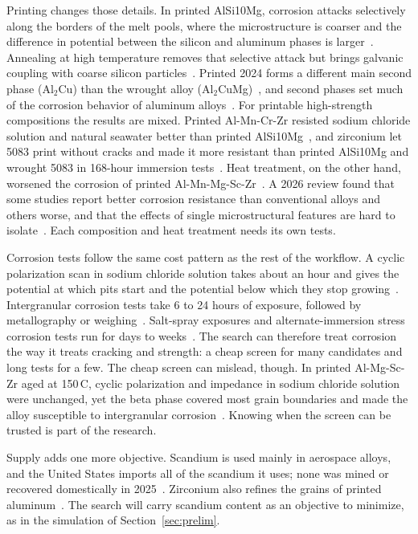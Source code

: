 \documentclass[12pt,letterpaper]{article}
\begin{document}
Printing changes those details. In printed AlSi10Mg, corrosion attacks
selectively along the borders of the melt pools, where the microstructure is
coarser and the difference in potential between the silicon and aluminum
phases is larger~\cite{cabrini2016,revilla2017}. Annealing at high temperature
removes that selective attack but brings galvanic coupling with coarse
silicon particles~\cite{cabrini2016}. Printed 2024 forms a different main
second phase (Al$_2$Cu) than the wrought alloy (Al$_2$CuMg)~\cite{gharbi2018},
and second phases set much of the corrosion behavior of aluminum
alloys~\cite{birbilis2005}. For printable high-strength compositions
the results are mixed. Printed Al-Mn-Cr-Zr resisted sodium chloride solution
and natural seawater better than printed AlSi10Mg~\cite{linder2024}, and
zirconium let 5083 print without cracks and made it more resistant than
printed AlSi10Mg and wrought 5083 in 168-hour immersion
tests~\cite{zhou2021}. Heat treatment, on the other hand, worsened the
corrosion of printed Al-Mn-Mg-Sc-Zr~\cite{zhang2023}. A 2026 review found
that some studies report better corrosion resistance than conventional
alloys and others worse, and that the effects of single microstructural
features are hard to isolate~\cite{alhashem2026}. Each composition and heat
treatment needs its own tests.

Corrosion tests follow the same cost pattern as the rest of the workflow. A
cyclic polarization scan in sodium chloride solution takes about an hour and
gives the potential at which pits start and the potential below which they
stop growing~\cite{astmG61}. Intergranular corrosion tests take 6 to 24
hours of exposure, followed by metallography or
weighing~\cite{astmG110,astmG67,cabreracorrea2022}. Salt-spray exposures and alternate-immersion
stress corrosion tests run for days to weeks~\cite{astmB117,astmG44}. The
search can therefore treat corrosion the way it treats cracking and strength:
a cheap screen for many candidates and long tests for a few. The cheap screen
can mislead, though. In printed Al-Mg-Sc-Zr aged at 150\,\textdegree{}C,
cyclic polarization and impedance in sodium chloride solution were unchanged,
yet the beta phase covered most grain boundaries and made the alloy
susceptible to intergranular corrosion~\cite{cabreracorrea2023}. Knowing when
the screen can be trusted is part of the research.

Supply adds one more objective. Scandium is used mainly in aerospace alloys,
and the United States imports all of the scandium it uses; none was mined or
recovered domestically in 2025~\cite{usgs2026sc}. Zirconium also refines the
grains of printed aluminum~\cite{martin2017}. The search will carry scandium
content as an objective to minimize, as in the simulation of
Section~\ref{sec:prelim}.
\end{document}
